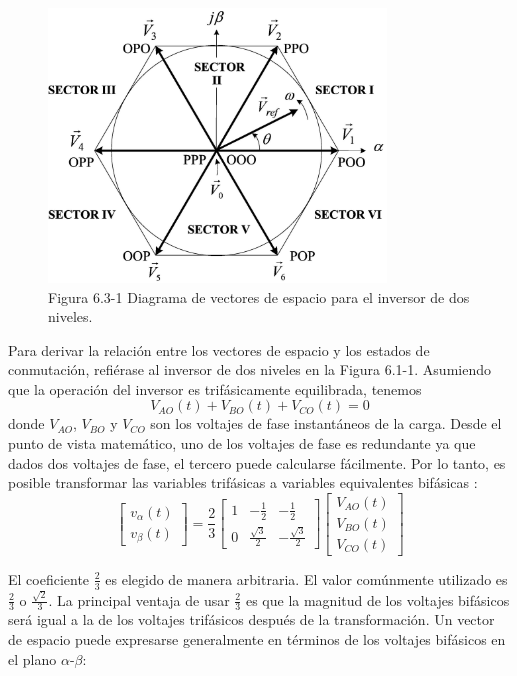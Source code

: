 \documentclass[letterpaper,12pt]{article}
\begin{document}
\begin{figure}[h]
    \centering
    \includegraphics[width=0.8\textwidth]{graficos/img99.jpg}
    \caption{Figura 6.3-1 Diagrama de vectores de espacio para el inversor de dos niveles.}
    \label{fig:diagrama_vectores_espacio}
\end{figure}
\FloatBarrier

Para derivar la relación entre los vectores de espacio y los estados de conmutación, refiérase al inversor de dos niveles en la Figura 6.1-1. Asumiendo que la operación del inversor es trifásicamente equilibrada, tenemos
\[
V_{AO}(t) + V_{BO}(t) + V_{CO}(t) = 0
\]
donde $V_{AO}$, $V_{BO}$ y $V_{CO}$ son los voltajes de fase instantáneos de la carga. Desde el punto de vista matemático, uno de los voltajes de fase es redundante ya que dados dos voltajes de fase, el tercero puede calcularse fácilmente. Por lo tanto, es posible transformar las variables trifásicas a variables equivalentes bifásicas \cite{ref5}:
\[
\begin{bmatrix}
v_{\alpha}(t) \\
v_{\beta}(t)
\end{bmatrix}
= \frac{2}{3}
\begin{bmatrix}
1 & -\frac{1}{2} & -\frac{1}{2} \\
0 & \frac{\sqrt{3}}{2} & -\frac{\sqrt{3}}{2}
\end{bmatrix}
\begin{bmatrix}
V_{AO}(t) \\
V_{BO}(t) \\
V_{CO}(t)
\end{bmatrix}
\]

El coeficiente $\frac{2}{3}$ es elegido de manera arbitraria. El valor comúnmente utilizado es $\frac{2}{3}$ o $\frac{\sqrt{2}}{3}$. La principal ventaja de usar $\frac{2}{3}$ es que la magnitud de los voltajes bifásicos será igual a la de los voltajes trifásicos después de la transformación. Un vector de espacio puede expresarse generalmente en términos de los voltajes bifásicos en el plano $\alpha$-$\beta$:
    
\end{document}
